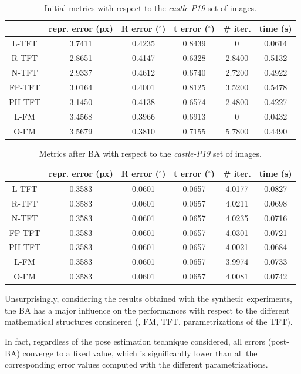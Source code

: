 \begin{table}[htbp]
  \centering
  \caption[\textit{castle-P19} Initial Metrics]{Initial metrics with respect to the \textit{castle-P19} set of images.}
  \label{tab:castleInit}
  \begin{tabular}{|*{6}{c}|}
    \hline
     & repr. error (px) & R error ($^{\circ}$) & t error ($^{\circ}$) & \# iter. & time (s)\\
    \hline
    \acs{L-TFT} & 3.7411 & 0.4235 & 0.8439 & 0 & 0.0614 \\
    \acs{R-TFT} & 2.8651 & 0.4147 & 0.6328 & 2.8400 & 0.5132 \\
    \acs{N-TFT} & 2.9337 & 0.4612 & 0.6740 & 2.7200 & 0.4922 \\
    \acs{FP-TFT} & 3.0164 & 0.4001 & 0.8125 & 3.5200 & 0.5478 \\
    \acs{PH-TFT} & 3.1450 & 0.4138 & 0.6574 & 2.4800 & 0.4227 \\
    \acs{L-FM} & 3.4568 & 0.3966 & 0.6913 & 0 & 0.0432 \\
    \acs{O-FM} & 3.5679 & 0.3810 & 0.7155 & 5.7800 & 0.4490 \\
    \hline
  \end{tabular}
\end{table}

\begin{table}[htbp]
  \centering
  \caption[\textit{castle-P19} Metrics with \acs{BA}]{Metrics after \acs{BA} with respect to the \textit{castle-P19} set of images.}
  \label{tab:castleBA}
  \begin{tabular}{|*{6}{c}|}
    \hline
     & repr. error (px) & R error ($^{\circ}$) & t error ($^{\circ}$) & \# iter. & time (s)\\
    \hline
    \acs{L-TFT} & 0.3583 & 0.0601 & 0.0657 & 4.0177 & 0.0827 \\
    \acs{R-TFT} & 0.3583 & 0.0601 & 0.0657 & 4.0211 & 0.0698 \\
    \acs{N-TFT} & 0.3583 & 0.0601 & 0.0657 & 4.0235 & 0.0716 \\
    \acs{FP-TFT} & 0.3583 & 0.0601 & 0.0657 & 4.0301 & 0.0721 \\
    \acs{PH-TFT} & 0.3583 & 0.0601 & 0.0657 & 4.0021 & 0.0684 \\
    \acs{L-FM} & 0.3583 & 0.0601 & 0.0657 & 3.9974 & 0.0733 \\
    \acs{O-FM} & 0.3583 & 0.0601 & 0.0657 & 4.0081 & 0.0742 \\
    \hline
  \end{tabular}
\end{table}

Unsurprisingly, considering the results obtained with the synthetic experiments, the \acs{BA} has a major influence on the performances with respect to the different mathematical structures considered (\eg, \acs{FM}, \acs{TFT}, parametrizations of the \acs{TFT}).

In fact, regardless of the pose estimation technique considered, all errors (post-\acs{BA}) converge to a fixed value, which is significantly lower than all the corresponding error values computed with the different parametrizations.\\

